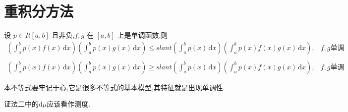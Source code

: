 \documentclass[../../main.tex]{subfiles}
\begin{document}
\section{重积分方法}

\begin{theorem}\label{Chebeshev不等式积分形式}
设 \( p \in R[a,b] \) 且非负,\( f,g \) 在 \([a,b]\) 上是单调函数,则
\begin{align*}
\left( \int_{a}^{b} p(x) f(x) \,\mathrm{d}x \right) \left( \int_{a}^{b} p(x) g(x) \,\mathrm{d}x \right) \leqslant slant \left( \int_{a}^{b} p(x) \,\mathrm{d}x \right) \left( \int_{a}^{b} p(x) f(x) g(x) \,\mathrm{d}x \right), & f,g\text{单调性相同} \\
\\
\left( \int_{a}^{b} p(x) f(x) \,\mathrm{d}x \right) \left( \int_{a}^{b} p(x) g(x) \,\mathrm{d}x \right) \geqslant slant \left( \int_{a}^{b} p(x) \,\mathrm{d}x \right) \left( \int_{a}^{b} p(x) f(x) g(x) \,\mathrm{d}x \right), & f,g\text{单调性相反}
\nonumber
\end{align*}
\end{theorem}
\begin{note}
本不等式要牢记于心,它是很多不等式的基本模型,其特征就是出现单调性.
\end{note}
\begin{remark}
{\color{blue}证法二}中的$\mathrm{d}\mu$应该看作测度.
\end{remark}
\end{document}
